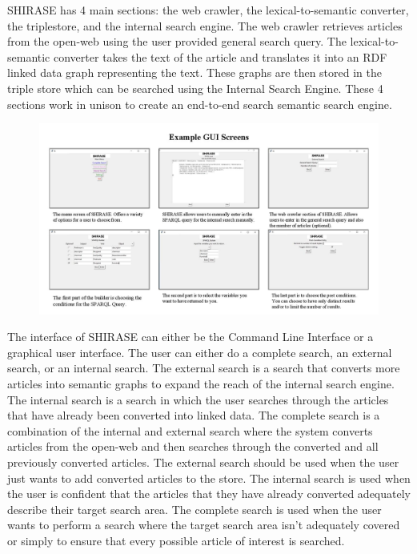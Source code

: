\documentclass[12pt]{article}
\begin{document}
	\quad SHIRASE has 4 main sections: the web crawler, the lexical-to-semantic converter, the triplestore, and the internal search engine. The web crawler retrieves articles from the open-web using the user provided general search query. The lexical-to-semantic converter takes the text of the article and translates it into an RDF linked data graph representing the text. These graphs are then stored in the triple store which can be searched using the Internal Search Engine. These 4 sections work in unison to create an end-to-end search semantic search engine.
	\begin{figure}[h!]
		\centering
		\includegraphics[scale=0.67]{ExampleGUIScreens}
	\end{figure}
	The interface of SHIRASE can either be the Command Line Interface or a graphical user interface. The user can either do a complete search, an external search, or an internal search. The external search is a search that converts more articles into semantic graphs to expand the reach of the internal search engine. The internal search is a search in which the user searches through the articles that have already been converted into linked data. The complete search is a combination of the internal and external search where the system converts articles from the open-web and then searches through the converted and all previously converted articles. The external search should be used when the user just wants to add converted articles to the store. The internal search is used when the user is confident that the articles that they have already converted adequately describe their target search area. The complete search is used when the user wants to perform a search where the target search area isn’t adequately covered or simply to ensure that every possible article of interest is searched. 
\end{document}
